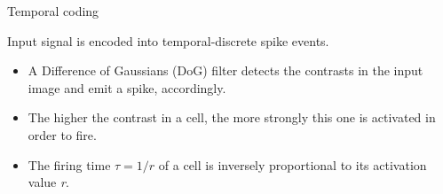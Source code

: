 \documentclass[10pt]{beamer}
\begin{document}
\begin{frame}{Temporal coding}

Input signal is encoded into temporal-discrete spike events.

\begin{itemize}
	\item A Difference of Gaussians (DoG) filter detects the contrasts
	in the input image and emit a spike, accordingly.
	
	\item The higher the contrast in a cell, the more strongly this one is activated in order to fire.
	
	\item The firing time $ \tau = 1/r $ of a cell is inversely proportional to its activation value \textit{r}.
\end{itemize}

\end{frame}
\end{document}
